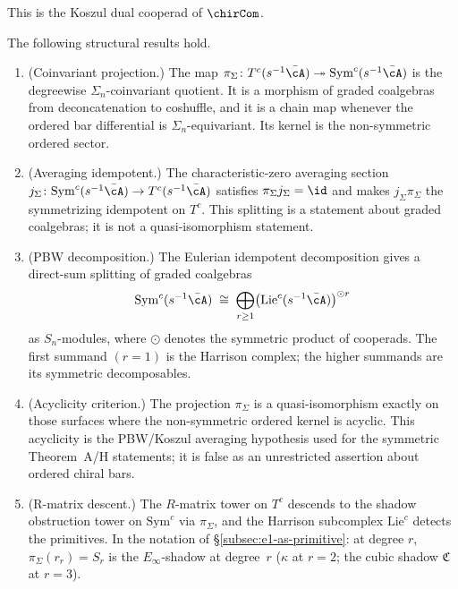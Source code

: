 \begin{theorem}
\begin{enumerate}[label=\textup{(\roman*)}]
 This is the Koszul dual cooperad of\/ $\chirCom$.
\end{enumerate}
The following structural results hold.
\begin{enumerate}[label=\textup{(\alph*)}]
\item \textup{(Coinvariant projection.)}
 The map
 $\pi_\Sigma\colon T^c(s^{-1}\bar\cA)\twoheadrightarrow
 \mathrm{Sym}^c(s^{-1}\bar\cA)$ is the degreewise
 $\Sigma_n$-coinvariant quotient. It is a morphism of graded
 coalgebras from deconcatenation to coshuffle, and it is a chain map
 whenever the ordered bar differential is $\Sigma_n$-equivariant.
 Its kernel is the non-symmetric ordered sector.
\item \textup{(Averaging idempotent.)}
 The characteristic-zero averaging section
 $j_\Sigma\colon\mathrm{Sym}^c(s^{-1}\bar\cA)\to
 T^c(s^{-1}\bar\cA)$ satisfies
 $\pi_\Sigma j_\Sigma=\id$ and makes
 $j_\Sigma\pi_\Sigma$ the symmetrizing idempotent on $T^c$.
 This splitting is a statement about graded coalgebras; it is not a
 quasi-isomorphism statement.
\item \textup{(PBW decomposition.)}
 The Eulerian idempotent decomposition gives a
 direct-sum splitting of graded coalgebras
 \begin{equation}\label{eq:eulerian-bar-decomposition}
 \mathrm{Sym}^c(s^{-1}\bar\cA)
 \;\cong\;
 \bigoplus_{r \ge 1}
 \bigl(\mathrm{Lie}^c(s^{-1}\bar\cA)\bigr)^{\odot r}
 \end{equation}
 as $S_n$-modules, where\/ $\odot$ denotes the
 symmetric product of cooperads.
 The first summand\/ $(r = 1)$ is the Harrison
 complex; the higher summands are its symmetric
 decomposables.
\item \textup{(Acyclicity criterion.)}
 The projection $\pi_\Sigma$ is a quasi-isomorphism exactly on those
 surfaces where the non-symmetric ordered kernel is acyclic. This
 acyclicity is the PBW/Koszul averaging hypothesis used for the
 symmetric Theorem~A/H statements; it is false as an unrestricted
 assertion about ordered chiral bars.
\item \textup{(R-matrix descent.)}
 The $R$-matrix tower on\/ $T^c$ descends to the
 shadow obstruction tower on\/ $\mathrm{Sym}^c$
 via\/ $\pi_\Sigma$, and the Harrison
 subcomplex\/ $\mathrm{Lie}^c$ detects the primitives.
 In the notation of\/
 \S\textup{\ref{subsec:e1-as-primitive}}: at degree\/
 $r$, $\pi_\Sigma(r_r) = S_r$ is the
 $E_\infty$-shadow at degree\/~$r$
 \textup{(}$\kappa$ at\/ $r = 2$;
 the cubic shadow\/ $\mathfrak{C}$ at\/ $r = 3$\textup{)}.
\end{enumerate}
\end{theorem}

